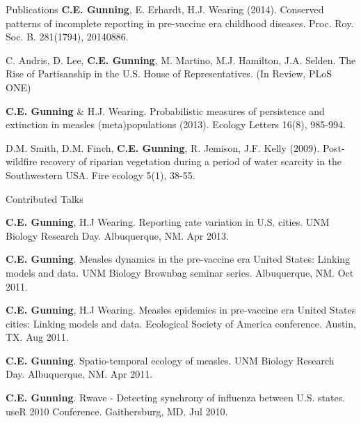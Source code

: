 \documentclass{resume} %
\begin{document}
\begin{rSection}{Publications}
{\bf C.E. Gunning}, E. Erhardt, H.J. Wearing (2014). 
Conserved patterns of incomplete reporting in pre-vaccine era childhood diseases.
Proc. Roy. Soc. B. 281(1794), 20140886. 

C. Andris, D. Lee, {\bf C.E. Gunning}, M. Martino, M.J.  Hamilton, J.A. Selden.
The Rise of Partisanship in the U.S. House of Representatives.  (In Review, PLoS
ONE)

{\bf C.E. Gunning} \& H.J. Wearing. Probabilistic measures of persistence
and extinction in measles (meta)populations (2013).  Ecology Letters 16(8), 985-994.

D.M. Smith, D.M. Finch, {\bf C.E. Gunning}, R. Jemison, J.F. Kelly (2009). Post-wildfire recovery of riparian vegetation during a period of water scarcity in the Southwestern USA. Fire ecology 5(1), 38-55.
\end{rSection}


\begin{rSection}{Contributed Talks}
\item {\bf C.E. Gunning}, H.J Wearing.  Reporting rate variation in U.S. cities.
UNM Biology Research Day. Albuquerque, NM. Apr 2013.
\item {\bf C.E. Gunning}.  Measles dynamics in the pre-vaccine era United States: Linking
models and data. UNM Biology Brownbag seminar series. Albuquerque, NM. Oct 2011.
\item {\bf C.E. Gunning}, H.J Wearing.  Measles epidemics in pre-vaccine era United States cities: Linking models and data. Ecological Society of America conference. Austin, TX. Aug 2011.
\item {\bf C.E. Gunning}.  Spatio-temporal ecology of measles. 
UNM Biology Research Day. Albuquerque, NM. Apr 2011.
\item {\bf C.E. Gunning}. Rwave - Detecting synchrony of influenza between U.S. states.
useR 2010 Conference. Gaithersburg, MD. Jul 2010.
\end{rSection}
\end{document}
